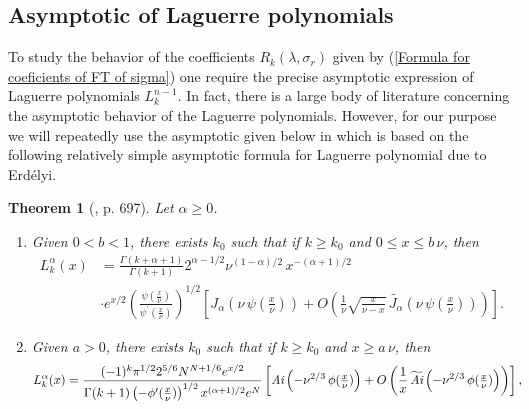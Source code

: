 \documentclass[11pt, reqno]{amsart}
\theoremstyle{plain}
\newtheorem{theorem}{Theorem}[section]
\theoremstyle{remark}
\theoremstyle{example}
\theoremstyle{definition}
\numberwithin{equation}{section}
\begin{document}
\subsection{Asymptotic of Laguerre polynomials} To study the behavior of the coefficients $R_k(\lambda, \sigma_r)$ given by (\ref{Formula for coeficients of FT of sigma}) one require the precise asymptotic expression of Laguerre polynomials $L_{k}^{n-1}$. In fact, there is a large body of literature concerning the asymptotic behavior of the Laguerre polynomials. However, for our purpose we will repeatedly use the asymptotic given below in  which is based on  the following relatively simple asymptotic formula for Laguerre polynomial due to Erd\'elyi.
\begin{theorem}[\cite{Askey-Wainger}, p. 697] \label{Laguerre-Asymp}
Let $\alpha \geq 0$.
\begin{enumerate}
    \item [\emph{(\emph{i})}] \hspace*{.7mm} Given $0<b<1$, there exists $k_{0}$ such that if $k \geq k_{0}$ and $0 \leq x \leq b \,  \nu$, then
    \begin{equation} \label{Bessel.regime}
        \begin{split}
            L^{\alpha}_{k}(x) & = \frac{\Gamma(k + \alpha +1)}{ \Gamma(k+1)} 2^{\alpha - 1/2} \nu^{(1 - \alpha)/2} \,  x^{-(\alpha +1)/2} \\
            & \cdot e^{x/2} \left( \frac{  \psi( \frac{x}{\nu} )  }{  \psi^{ \prime} ( \frac{x}{\nu} )  }  \right)^{1/2} \left[ J_{\alpha} \left( \nu \, \psi( \textstyle\frac{x}{\nu} )  \right) +  O \left ( \frac{1}{\nu} \sqrt{\frac{x}{\nu - x}} \,   \widetilde{J_{\alpha}} \left( \nu \, \psi( \textstyle\frac{x}{\nu} )  \right)   \right) \right].
        \end{split}
    \end{equation}
    \item [\emph{(\emph{ii})}] \hspace*{.7mm} Given $a>0$, there exists $k_{0}$ such that if $k \geq k_{0}$ and $x \geq a \,  \nu$, then
    \begin{equation} \label{Bessel.regime}
        \begin{split}
            L^{\alpha}_{k}(x) & = \frac{  (-1)^{k} \pi^{1/2} 2^{5/6} N^{N + 1/6} e^{x/2}  
            }
            { \Gamma(k+1) \left( - \phi^{\prime}(\textstyle\frac{ x}{\nu})  \right)^{1/2} x^{(\alpha +1)/2} e^{N}
            }    \left[ \emph{Ai} \left( - \nu^{2/3} \, \phi( \textstyle\frac{x}{\nu} )  \right) +  O \left( {\frac{1}{x} } \, \widetilde{ \emph{Ai}} \left( - \nu^{2/3} \, \phi( {\textstyle\frac{x}{\nu} } )  \right)   \right) \right],

\end{split}
\end{equation}
\end{enumerate}
\end{theorem}
\end{document}
